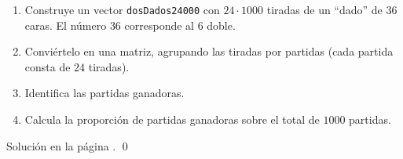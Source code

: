 \documentclass[10pt,a4paper]{article}\usepackage[]{graphicx}\usepackage[]{color}
\begin{document}
                                                                                                                                                            \begin{ejercicio}
                                                                                                                                                            \label{tut03:ejercicio11}
                                                                                                                                                            \quad
                                                                                                                                                            \begin{enumerate}
                                                                                                                                                            \item Construye un vector {\tt dosDados24000} con $24\cdot 1000$ tiradas de un ``dado'' de 36 caras. El número $36$ corresponde al $6$ doble.
                                                                                                                                                            \item Conviértelo en una matriz, agrupando las tiradas por partidas (cada partida consta de $24$ tiradas).
                                                                                                                                                            \item Identifica las partidas ganadoras.
                                                                                                                                                            \item Calcula la proporción de partidas ganadoras sobre el total de $1000$ partidas.
                                                                                                                                                            \end{enumerate}
                                                                                                                                                            
                                                                                                                                                            Solución en la página \pageref{tut03:ejercicio11:sol}.
                                                                                                                                                            \qed
                                                                                                                                                            \end{ejercicio}
                                                                                                                                                            
\end{document}
